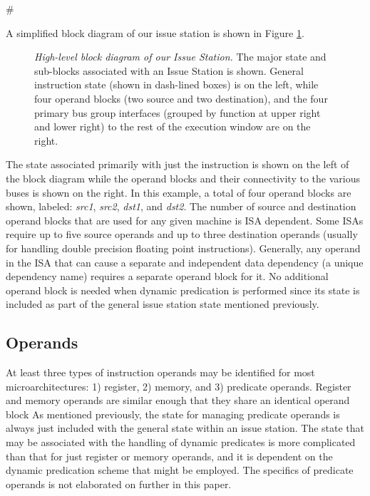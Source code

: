 #\documentclass[10pt,dvips]{article}
\begin{document}
A simplified block diagram of our issue station is shown in 
Figure \ref{fig:issuestation}.
%
\begin{figure}
\centering
\scriptsize {
}
\caption{{\em High-level block diagram of our Issue Station.} 
The major state and sub-blocks associated with an Issue Station is shown.
General instruction state (shown in dash-lined boxes) is
on the left, while
four operand blocks (two source and two destination),
and the four primary bus group interfaces (grouped by function at
upper right and lower right) to the rest of the
execution window are on the right.}
\label{fig:issuestation}
\end{figure}
%
The state associated primarily with just the instruction is
shown on the left of the block diagram while the operand blocks
and their connectivity to the various buses is shown on the
right.  
In this example, a total of four operand blocks are shown, labeled:
\textit{src1}, 
\textit{src2}, 
\textit{dst1}, 
and \textit{dst2}.
The number of source and destination operand blocks that are
used for any given machine is ISA dependent.
Some ISAs require up to five source operands and up to three destination
operands (usually for handling double precision floating point 
instructions).
Generally, any operand in the ISA that can cause a separate
and independent data dependency (a unique dependency name)
requires a separate operand block for it.
No additional operand block is needed when dynamic predication
is performed since its state is included as
part of the general issue station state mentioned previously.
%
%
\subsection{Operands}
%
At least three types of instruction operands may be identified
for most microarchitectures: 
1) register, 2) memory, and 3) predicate operands.
Register and memory operands are similar enough that
they share an identical operand block
As mentioned previously, the state for managing predicate
operands is always just included with the general state within
an issue station.
The state that may be associated with the handling of
dynamic predicates is more complicated than that for
just register or memory operands, and it is dependent
on the dynamic predication scheme that might be employed.
The specifics of predicate operands is not elaborated on
further in this paper.
\end{document}
